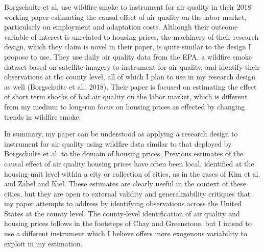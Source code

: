 \documentclass[12pt]{article}
\begin{document}
Borgschulte et al. use wildfire smoke to instrument for air quality in their 2018 working paper estimating the causal effect of air quality on the labor market, particularly on employment and adaptation costs.  Although their outcome variable of interest is unrelated to housing prices, the machinery of their research design, which they claim is novel in their paper, is quite similar to the design I propose to use.  They use daily air quality data from the EPA, a wildfire smoke dataset based on satellite imagery to instrument for air quality, and identify their observations at the county level, all of which I plan to use in my research design as well (Borgschulte et al., 2018).  Their paper is focused on estimating the effect of short term shocks of bad air quality on the labor market, which is different from my medium to long-run focus on housing prices as effected by changing trends in wildfire smoke.  

In summary, my paper can be understood as applying a research design to instrument for air quality using wildfire data similar to that deployed by Borgschulte et al. to the domain of housing prices.  Previous estimates of the causal effect of air quality housing prices have often been local, identified at the housing-unit level within a city or collection of cities, as in the cases of Kim et al. and Zabel and Kiel.  These estimates are clearly useful in the context of these cities, but they are open to external validity and generalizability critiques that my paper attempts to address by identifying observations across the United States at the county level.  The county-level identification of air quality and housing prices follows in the footsteps of Chay and Greenstone, but I intend to use a different instrument which I believe offers more exogenous variability to exploit in my estimation.  
\end{document}
